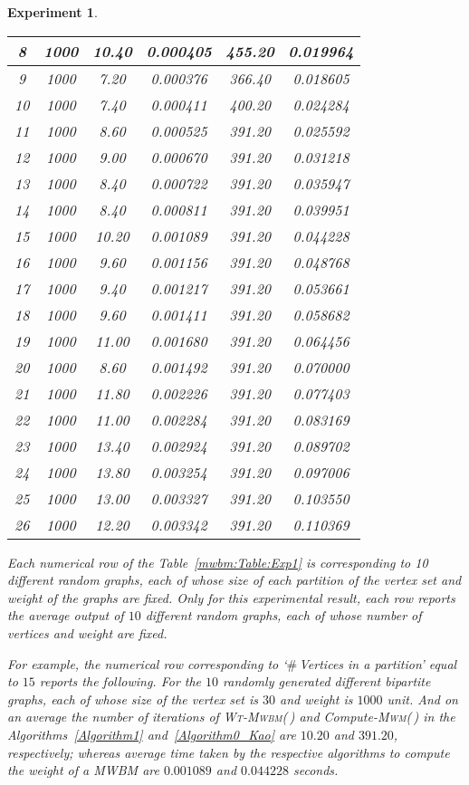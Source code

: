 \documentclass[runningheads,a4paper]{llncs}
\newtheorem{experiment}{Experiment}
\begin{document}
\begin{experiment}
\begin{table}[!htb]
{\begin{tabular}{|c|c|c|c|c|c|}
8 & 1000 & 10.40 & 0.000405 & 455.20 & 0.019964 \\ \hline
9 & 1000 & 7.20 & 0.000376 & 366.40 & 0.018605 \\ \hline
10 & 1000 & 7.40 & 0.000411 & 400.20 & 0.024284 \\ \hline
11 & 1000 & 8.60 & 0.000525 & 391.20 & 0.025592 \\ \hline
12 & 1000 & 9.00 & 0.000670 & 391.20 & 0.031218 \\ \hline
13 & 1000 & 8.40 & 0.000722 & 391.20 & 0.035947 \\ \hline
14 & 1000 & 8.40 & 0.000811 & 391.20 & 0.039951 \\ \hline
15 & 1000 & 10.20 & 0.001089 & 391.20 & 0.044228 \\ \hline
16 & 1000 & 9.60 & 0.001156 & 391.20 & 0.048768 \\ \hline
17 & 1000 & 9.40 & 0.001217 & 391.20 & 0.053661 \\ \hline
18 & 1000 & 9.60 & 0.001411 & 391.20 & 0.058682 \\ \hline
19 & 1000 & 11.00 & 0.001680 & 391.20 & 0.064456 \\ \hline
20 & 1000 & 8.60 & 0.001492 & 391.20 & 0.070000 \\ \hline
21 & 1000 & 11.80 & 0.002226 & 391.20 & 0.077403 \\ \hline
22 & 1000 & 11.00 & 0.002284 & 391.20 & 0.083169 \\ \hline
23 & 1000 & 13.40 & 0.002924 & 391.20 & 0.089702 \\ \hline
24 & 1000 & 13.80 & 0.003254 & 391.20 & 0.097006 \\ \hline
25 & 1000 & 13.00 & 0.003327 & 391.20 & 0.103550 \\ \hline
26 & 1000 & 12.20 & 0.003342 & 391.20 & 0.110369 \\ \hline
\end{tabular}
}
\end{table}


Each numerical row of the Table~\ref{mwbm:Table:Exp1} is corresponding to 10  different random graphs, each of whose size of each partition of the vertex set and weight of the graphs are fixed.
Only for this experimental result, each row reports the average output  of $10$ different random graphs, each of whose number of vertices and weight are fixed.



For example, the numerical row corresponding to `$\#$\,Vertices in a partition' equal to $15$ reports the following. For the $10$ randomly generated different bipartite graphs, each of whose size of the vertex set is $30$ and weight is $1000$ unit. And on an average the number of iterations of \textsc{Wt-Mwbm}(\,) and Compute-\textsc{Mwm}(\,) in the Algorithms~\ref{Algorithm1} and~\ref{Algorithm0_Kao} are $10.20$ and $391.20$, respectively; whereas average time taken by the respective algorithms to compute the weight of a MWBM are $0.001089$ and $0.044228$ seconds.  


\end{experiment}
\end{document}
